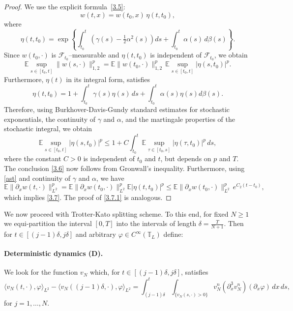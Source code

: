 \documentclass[a4paper,12pt]{article}
\numberwithin{equation}{section}
\def\f{\varphi}
\def\d{\partial}
\def\f{\varphi}
\begin{document}
\medskip

\begin{proof}
We use the explicit formula~\eqref{3.5}: 
\begin{equation}
\label{3.8}
w(t,x) = w(t_0,x)\,\eta(t,t_0),
\end{equation}
where
\begin{equation*}
\label{eq:eta-def}
\eta(t,t_0)
=
\exp\left\{
\int_{t_0}^t \left( \gamma(s) - \tfrac12 \alpha^2(s) \right) ds
+ \int_{t_0}^t \alpha(s) \, d\beta(s)\right\}.
\end{equation*}
Since $w(t_0,\cdot)$ is $\mathcal{F}_{t_0}$--measurable and
$\eta(t,t_0)$ is independent of $\mathcal{F}_{t_0}$, we obtain
\begin{equation*}
\label{3.9}
\mathbb{E} \sup_{s \in [t_0,t]} \|w(s, \cdot)\|_{1,2}^p
=
\mathbb{E}\|w(t_0, \cdot)\|_{1,2}^p
\,\mathbb{E} \sup_{s \in [t_0,t]}|\eta(s,t_0)|^p .
\end{equation*}
Furthermore, $\eta(t)$ in its integral form, satisfies
\[
\eta(t, t_0)  = 1 + \int_{t_0}^t \gamma(s) \eta(s) \, ds + \int_{t_0}^t \alpha(s)  \eta(s) d \beta(s).
\]
Therefore, using Burkhover-Davis-Gundy standard estimates for stochastic exponentials, the continuity of
$\gamma$ and $\alpha$, and the martingale properties of the stochastic
integral, we obtain
\[
\mathbb{E} \sup_{s \in [t_0,t]}|\eta(s,t_0)|^p \leq 1 + C \int_{t_0}^t \mathbb{E} \sup_{\tau \in [t_0,s]}|\eta(\tau,t_0)|^p \, ds,
\]
where the constant $C>0$ is independent of $t_0$ and $t$, but depends on $p$ and $T$. The conclusion \eqref{3.6} now follows from Gronwall's inequality. Furthermore, using \eqref{ast} and continuity of $\gamma$ and $\alpha$, we have
\begin{equation}\label{3.10}
  \mathbb{E}\|\d_x w(t, \cdot)\|_{L^2}^p =\mathbb{E}\|\d_x w(t_0, \cdot)\|_{L^2}^p \mathbb{E} |\eta(t,t_0)|^p 
\le
\mathbb{E}\|\d_x w(t_0, \cdot)\|_{L^2}^p \,
e^{C_2 (t-t_0)},
\end{equation}
which implies \eqref{3.7}. The proof of \eqref{3.7.1} is analogous.

\end{proof}
 We now proceed with Trotter-Kato splitting scheme. To this end, for fixed $N \geq 1$ we equi-partition the interval $[0,T]$ into the intervals of length $\delta = \frac{T}{N+1}$. Then for $t \in [(j-1) \delta, j \delta]$ and arbitrary $\varphi \in C^\infty(\mathbb{T}_L)$ define:

\medskip

\paragraph{Deterministic dynamics (D).}
We look for the function $v_N$ which, for
$t \in [(j-1)\delta,j\delta]$, satisfies
\begin{equation*}
\label{3:10}
\langle v_N(t,\cdot),\varphi\rangle_{L^2}
-
\langle v_N((j-1)\delta,\cdot),\varphi\rangle_{L^2}
=
\int_{(j-1)\delta}^{t}
\int_{\{v_N(s,\cdot)>0\}}
v_N^n (\d_x^3 v_N^n) (\d_x \f) \,dx\,ds,
\end{equation*}
for $j=1,\dots,N$.
\end{document}
